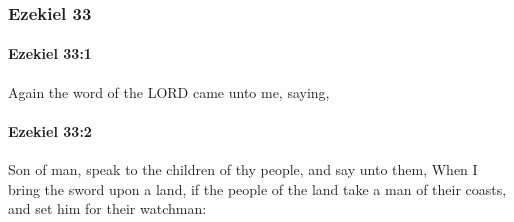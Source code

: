 	\subsubsection{Ezekiel 33} %
		\label{EZEKIEL-33}

		\paragraph{Ezekiel 33:1} %
			\label{EZEKIEL-33-1}

			Again the word of the LORD came unto me, saying,


		\paragraph{Ezekiel 33:2} %
			\label{EZEKIEL-33-2}

			Son of man, speak to the children of thy people, and say unto them, When I bring the sword upon a land, if the people of the land take a man of their coasts, and set him for their watchman:

